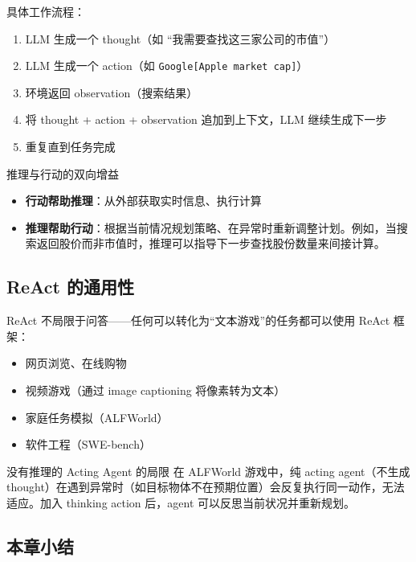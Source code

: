 \documentclass[a4paper]{article}
\begin{document}
具体工作流程：
\begin{enumerate}
    \item LLM 生成一个 thought（如 ``我需要查找这三家公司的市值''）
    \item LLM 生成一个 action（如 \texttt{Google{[}Apple market cap{]}}）
    \item 环境返回 observation（搜索结果）
    \item 将 thought + action + observation 追加到上下文，LLM 继续生成下一步
    \item 重复直到任务完成
\end{enumerate}

\begin{knowledgebox}{推理与行动的双向增益}
\begin{itemize}
    \item \textbf{行动帮助推理}：从外部获取实时信息、执行计算
    \item \textbf{推理帮助行动}：根据当前情况规划策略、在异常时重新调整计划。例如，当搜索返回股价而非市值时，推理可以指导下一步查找股份数量来间接计算。
\end{itemize}
\end{knowledgebox}

\subsection{ReAct 的通用性}

ReAct 不局限于问答——任何可以转化为``文本游戏''的任务都可以使用 ReAct 框架：

\begin{itemize}
    \item 网页浏览、在线购物
    \item 视频游戏（通过 image captioning 将像素转为文本）
    \item 家庭任务模拟（ALFWorld）
    \item 软件工程（SWE-bench）
\end{itemize}

\begin{warningbox}{没有推理的 Acting Agent 的局限}
在 ALFWorld 游戏中，纯 acting agent（不生成 thought）在遇到异常时（如目标物体不在预期位置）会反复执行同一动作，无法适应。加入 thinking action 后，agent 可以反思当前状况并重新规划。
\end{warningbox}

\subsection{本章小结}
\end{document}
